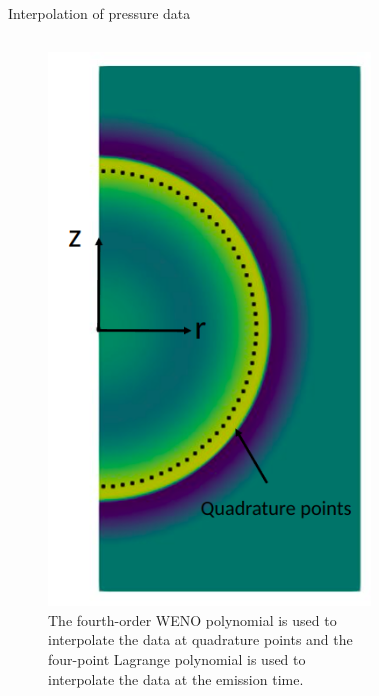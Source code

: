 \documentclass[10pt, aspectratio=169]{beamer}
\begin{document}
\begin{frame}{Interpolation of pressure data}
	\begin{columns}
		\begin{figure}
			\centering
			\includegraphics[scale=0.21]{images/arc.png}
			\caption*{The fourth-order WENO polynomial is used to interpolate the data at quadrature points and the four-point Lagrange polynomial is used to interpolate the data at the emission time.}
		\end{figure}
		\begin{figure}
			\centering

\end{figure}
\end{columns}
\end{frame}
\end{document}
